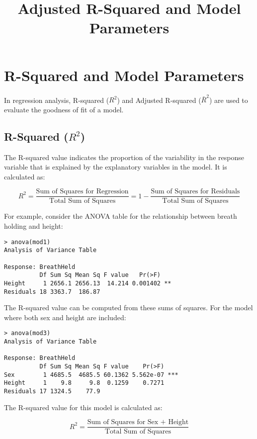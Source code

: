 \documentclass{article}
\begin{document}
\title{Adjusted R-Squared and Model Parameters}
\author{}
\date{}
\maketitle

\section{R-Squared and Model Parameters}

In regression analysis, R-squared (\(R^2\)) and Adjusted R-squared (\(\bar{R}^2\)) are used to evaluate the goodness of fit of a model.

\subsection{R-Squared (\(R^2\))}

The R-squared value indicates the proportion of the variability in the response variable that is explained by the explanatory variables in the model. It is calculated as:

\[
R^2 = \frac{\text{Sum of Squares for Regression}}{\text{Total Sum of Squares}} = 1 - \frac{\text{Sum of Squares for Residuals}}{\text{Total Sum of Squares}}
\]

For example, consider the ANOVA table for the relationship between breath holding and height:

\begin{verbatim}
> anova(mod1)
Analysis of Variance Table

Response: BreathHeld
          Df Sum Sq Mean Sq F value   Pr(>F)   
Height     1 2656.1 2656.13  14.214 0.001402 **
Residuals 18 3363.7  186.87 
\end{verbatim}

The R-squared value can be computed from these sums of squares. For the model where both sex and height are included:

\begin{verbatim}
> anova(mod3)
Analysis of Variance Table

Response: BreathHeld
          Df Sum Sq Mean Sq F value    Pr(>F)    
Sex        1 4685.5  4685.5 60.1362 5.562e-07 ***
Height     1    9.8     9.8  0.1259    0.7271    
Residuals 17 1324.5    77.9     
\end{verbatim}

The R-squared value for this model is calculated as:

\[
R^2 = \frac{\text{Sum of Squares for Sex + Height}}{\text{Total Sum of Squares}}
\]
\end{document}
